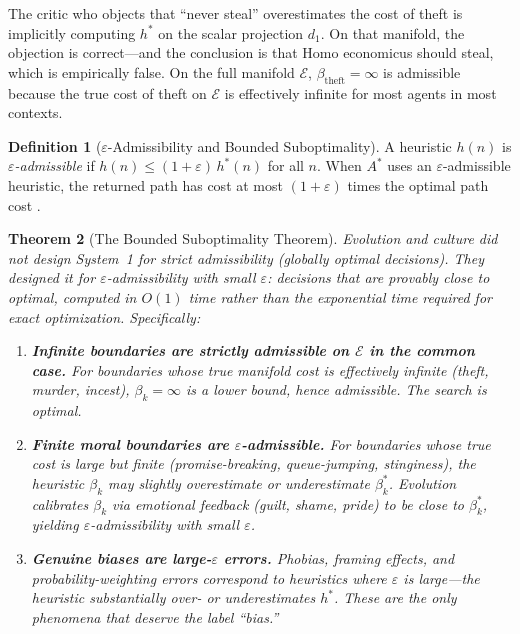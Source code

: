 \documentclass[12pt]{article}
\newtheorem{theorem}{Theorem}[section]
\theoremstyle{definition}
\newtheorem{definition}[theorem]{Definition}
\theoremstyle{remark}
\newcommand{\E}{\mathcal{E}}               %
\begin{document}
The critic who objects that ``never steal'' overestimates the cost of theft is implicitly computing $h^*$ on the scalar projection $d_1$.  On that manifold, the objection is correct---and the conclusion is that Homo economicus should steal, which is empirically false.  On the full manifold $\E$, $\beta_{\text{theft}} = \infty$ is admissible because the true cost of theft on $\E$ is effectively infinite for most agents in most contexts.

\begin{definition}[$\varepsilon$-Admissibility and Bounded Suboptimality]
\label{def:epsilon_admissible}
A heuristic $h(n)$ is \emph{$\varepsilon$-admissible} if $h(n) \leq (1 + \varepsilon)\, h^*(n)$ for all $n$.  When $A^*$ uses an $\varepsilon$-admissible heuristic, the returned path has cost at most $(1 + \varepsilon)$ times the optimal path cost \cite{hart1968}.
\end{definition}

\begin{theorem}[The Bounded Suboptimality Theorem]
\label{thm:bounded_suboptimality}
Evolution and culture did not design System~1 for strict admissibility (globally optimal decisions).  They designed it for \emph{$\varepsilon$-admissibility with small $\varepsilon$}: decisions that are provably close to optimal, computed in $O(1)$ time rather than the exponential time required for exact optimization.  Specifically:
\begin{enumerate}
    \item \textbf{Infinite boundaries are strictly admissible on $\E$ in the common case.}  For boundaries whose true manifold cost is effectively infinite (theft, murder, incest), $\beta_k = \infty$ is a lower bound, hence admissible.  The search is optimal.
    \item \textbf{Finite moral boundaries are $\varepsilon$-admissible.}  For boundaries whose true cost is large but finite (promise-breaking, queue-jumping, stinginess), the heuristic $\beta_k$ may slightly overestimate or underestimate $\beta_k^*$.  Evolution calibrates $\beta_k$ via emotional feedback (guilt, shame, pride) to be close to $\beta_k^*$, yielding $\varepsilon$-admissibility with small $\varepsilon$.
    \item \textbf{Genuine biases are large-$\varepsilon$ errors.}  Phobias, framing effects, and probability-weighting errors correspond to heuristics where $\varepsilon$ is large---the heuristic substantially over- or underestimates $h^*$.  These are the \emph{only} phenomena that deserve the label ``bias.''
\end{enumerate}
\end{theorem}
\end{document}
